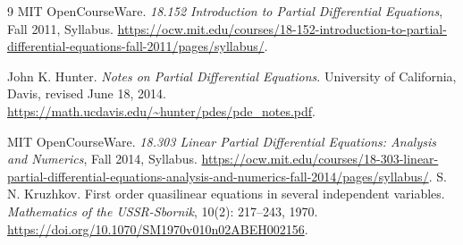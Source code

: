 \documentclass[UTF8,12pt,a4paper,fontset=fandol]{ctexbook}
\begin{document}
\begin{thebibliography}{9}
  MIT OpenCourseWare.
  \textit{18.152 Introduction to Partial Differential Equations}, Fall 2011, Syllabus.
  \url{https://ocw.mit.edu/courses/18-152-introduction-to-partial-differential-equations-fall-2011/pages/syllabus/}.

  John K. Hunter.
  \textit{Notes on Partial Differential Equations}.
  University of California, Davis, revised June 18, 2014.
  \url{https://math.ucdavis.edu/~hunter/pdes/pde_notes.pdf}.

  MIT OpenCourseWare.
  \textit{18.303 Linear Partial Differential Equations: Analysis and Numerics}, Fall 2014, Syllabus.
  \url{https://ocw.mit.edu/courses/18-303-linear-partial-differential-equations-analysis-and-numerics-fall-2014/pages/syllabus/}.
  S. N. Kruzhkov.
  First order quasilinear equations in several independent variables.
  \textit{Mathematics of the USSR-Sbornik}, 10(2): 217--243, 1970.
  \url{https://doi.org/10.1070/SM1970v010n02ABEH002156}.
\end{thebibliography}
\end{document}
